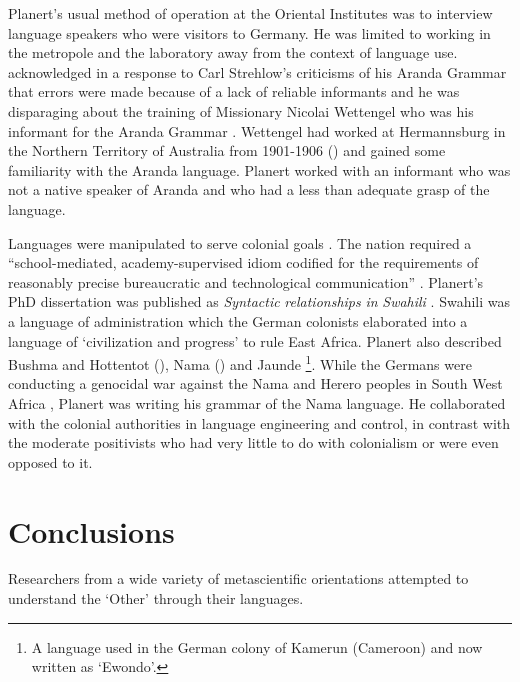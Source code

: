 \documentclass[output=paper]{langsci/langscibook}
\begin{document}
Planert’s usual method of operation at the Oriental Institutes was to interview language speakers who were visitors to Germany. He was limited to working in the metropole and the laboratory away from the context of language use. \citet{planert_erwiderung_1908} acknowledged in a response to Carl Strehlow’s criticisms of his Aranda Grammar that errors were made because of a lack of reliable informants and he was disparaging about the training of Missionary Nicolai Wettengel who was his informant for the Aranda Grammar \citep{planert_australische_1907}.  Wettengel had worked at Hermannsburg in the Northern Territory of Australia from 1901-1906 (\citealt[1154]{strehlow_tale_2011}) and gained some familiarity with the Aranda language. Planert worked with an informant who was not a native speaker of Aranda and who had a less than adequate grasp of the language. 

Languages were manipulated to serve colonial goals \citep[88]{errington_linguistics_2008}. The nation required a “school-mediated, academy-supervised idiom codified for the requirements of reasonably precise bureaucratic and technological communication” \citep[57]{gellner_nations_1983}. Planert’s PhD dissertation was published as \textit{Syntactic} \textit{relationships} \textit{in} \textit{Swahili} \citep{Planert1907a}. Swahili was a language of administration which the German colonists elaborated into a language of ‘civilization and progress’ to rule East Africa. Planert also described Bushma and Hottentot (\citeyear{planert_handbuch_1905}), Nama (\citeyear{planert_handbuch_1905}) and Jaunde \citep{nekes_lehrbuch_1911}\footnote{ \textrm{A language used in the German colony of Kamerun (Cameroon) and now written as ‘Ewondo’.}}. While the Germans were conducting a genocidal war against the Nama and Herero peoples in South West Africa \citep{hull_military_2005}, Planert was writing his grammar of the Nama language. He collaborated with the colonial authorities in language engineering and control, in contrast with the moderate positivists who had very little to do with colonialism or were even opposed to it. 

\section{Conclusions} 

Researchers from a wide variety of metascientific orientations attempted to understand the ‘Other’ through their languages. 
\end{document}
